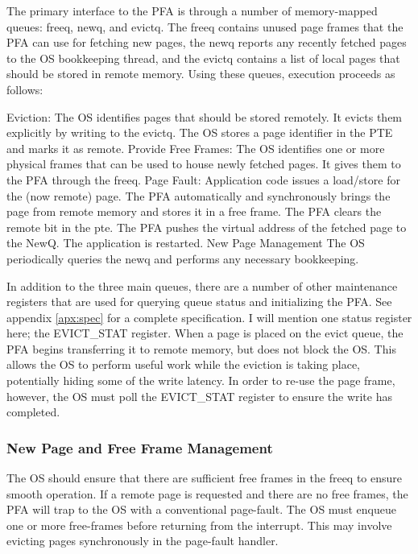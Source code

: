 The primary interface to the PFA is through a number of memory-mapped queues:
\gls{freeq}, \gls{newq}, and \gls{evictq}. The \gls{freeq} contains unused page frames that the PFA can
use for fetching new pages, the \gls{newq} reports any recently fetched pages to the
OS bookkeeping thread, and the \gls{evictq} contains a list of local pages that
should be stored in remote memory. Using these queues, execution proceeds as
follows:

\begin{outline}[enumerate]
  \1 Eviction:
      \2 The OS identifies pages that should be stored remotely.
      \2 It evicts them explicitly by writing to the \gls{evictq}.
      \2 The OS stores a page identifier in the PTE and marks it as remote.
  \1 Provide Free Frames:
      \2 The OS identifies one or more physical frames that can be used to
      house newly fetched pages.
      \2 It gives them to the PFA through the \gls{freeq}.
  \1 Page Fault:
      \2 Application code issues a load/store for the (now remote) page.
      \2 The PFA automatically and synchronously brings the page from remote
      memory and stores it in a free frame.
      \2 The PFA clears the remote bit in the pte.
      \2 The PFA pushes the virtual address of the fetched page to the NewQ.
      \2 The application is restarted.
  \1 New Page Management
      \2 The OS periodically queries the \gls{newq} and performs any
      necessary bookkeeping.
\end{outline}

In addition to the three main queues, there are a number of other maintenance
registers that are used for querying queue status and initializing the PFA. See
appendix \ref{apx:spec} for a complete specification. I will mention one status
register here; the EVICT\_STAT register. When a page is placed on the evict
queue, the PFA begins transferring it to remote memory, but does not block
the OS. This allows the OS to perform useful work while the eviction is taking
place, potentially hiding some of the write latency. In order to re-use the
page frame, however, the OS must poll the EVICT\_STAT register to ensure the
write has completed.

\subsubsection{New Page and Free Frame Management}
The OS should ensure that there are sufficient free frames in the \gls{freeq} to
ensure smooth operation. If a remote page is requested and there are no free
frames, the PFA will trap to the OS with a conventional page-fault. The OS must
enqueue one or more free-frames before returning from the interrupt. This may
involve evicting pages synchronously in the page-fault handler.

